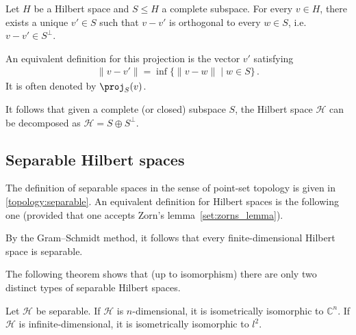     \begin{theorem}\label{functional:projection_theorem}
        Let $H$ be a Hilbert space and $S\leq H$ a complete subspace. For every $v\in H$, there exists a unique $v'\in S$ such that $v-v'$ is orthogonal to every $w\in S$, i.e.~$v-v'\in S^\perp$.
    \end{theorem}
    \begin{remark}
        An equivalent definition for this projection is the vector $v'$ satisfying
        \begin{gather}
            \|v-v'\| = \inf\{\|v-w\|\mid w\in S\}\,.
        \end{gather}
        It is often denoted by $\proj_S(v)$.
    \end{remark}
    \begin{result}
        It follows that given a complete (or closed) subspace $S$, the Hilbert space $\mathcal{H}$ can be decomposed as $\mathcal{H}=S\oplus S^\perp$.
    \end{result}


\subsection{Separable Hilbert spaces}

    The definition of separable spaces in the sense of point-set topology is given in \cref{topology:separable}. An equivalent definition for Hilbert spaces is the following one (provided that one accepts Zorn's lemma~\ref{set:zorns_lemma}).
    \begin{example}
        By the Gram--Schmidt method, it follows that every finite-dimensional Hilbert space is separable.
    \end{example}

    The following theorem shows that (up to isomorphism) there are only two distinct types of separable Hilbert spaces.
    \begin{theorem}
        Let $\mathcal{H}$ be separable. If $\mathcal{H}$ is $n$-dimensional, it is isometrically isomorphic to $\mathbb{C}^n$. If $\mathcal{H}$ is infinite-dimensional, it is isometrically isomorphic to $l^2$.
    \end{theorem}

